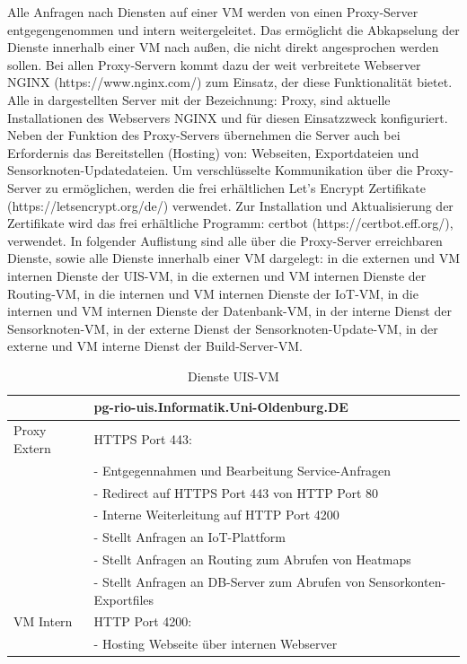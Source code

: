 Alle Anfragen nach Diensten auf einer VM werden von einen Proxy-Server entgegengenommen und intern weitergeleitet.
Das ermöglicht die Abkapselung der Dienste innerhalb einer VM nach außen, die nicht direkt angesprochen werden sollen.
Bei allen Proxy-Servern kommt dazu der weit verbreitete Webserver NGINX (https://www.nginx.com/) zum Einsatz, der diese Funktionalität bietet.
Alle in  dargestellten Server mit der Bezeichnung: Proxy, sind aktuelle Installationen des Webservers NGINX und für diesen Einsatzzweck konfiguriert.
Neben der Funktion des Proxy-Servers übernehmen die Server auch bei Erfordernis das Bereitstellen (Hosting) von: Webseiten, Exportdateien und Sensorknoten-Updatedateien.
Um verschlüsselte Kommunikation über die Proxy-Server zu ermöglichen, werden die frei erhältlichen Let's Encrypt Zertifikate (https://letsencrypt.org/de/) verwendet.
Zur Installation und Aktualisierung der Zertifikate wird das frei erhältliche Programm: certbot (https://certbot.eff.org/), verwendet.
In folgender Auflistung sind alle über die Proxy-Server erreichbaren Dienste, sowie alle Dienste innerhalb einer VM dargelegt:
in  die externen und VM internen Dienste der UIS-VM,
in  die externen und VM internen Dienste der Routing-VM,
in  die internen und VM internen Dienste der IoT-VM,
in  die internen und VM internen Dienste der Datenbank-VM,
in  der interne Dienst der Sensorknoten-VM,
in  der externe Dienst der Sensorknoten-Update-VM,
in  der externe und VM interne Dienst der Build-Server-VM.\par\bigskip
\begin{table}[H]\caption{Dienste UIS-VM}\label{tbl:dieuis}
\begin{tabularx}{\textwidth}{|l|X|}
	\hline
	&  \textbf{pg-rio-uis.Informatik.Uni-Oldenburg.DE}\\ 
	\hline Proxy Extern
	& HTTPS Port 443:\\
	& - Entgegennahmen und Bearbeitung Service-Anfragen\\
	& - Redirect auf HTTPS Port 443 von HTTP Port 80\\
	& - Interne Weiterleitung auf HTTP Port 4200\\
	& - Stellt Anfragen an IoT-Plattform\\
	& - Stellt Anfragen an Routing zum Abrufen von Heatmaps\\
	& - Stellt Anfragen an DB-Server zum Abrufen von Sensorkonten-Exportfiles\\
	\hline VM Intern
	&  HTTP Port 4200:\\
	& - Hosting Webseite über internen Webserver\\	 
	\hline
\end{tabularx}
\end{table} 
\par\bigskip 

